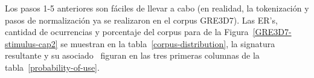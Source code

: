 

Los pasos 1-5 anteriores son f\'aciles de llevar a cabo (en realidad, la tokenizaci\'on y
pasos de normalizaci\'on ya se realizaron en el corpus GRE3D7). 
Las ER's, cantidad de ocurrencias y porcentaje del corpus para de la Figura~\ref{GRE3D7-stimulus-cap2} se muestran en la tabla~\ref{corpus-distribution}, la signatura resultante y su asociado \puse\ figuran en las tres primeras columnas de la tabla~\ref{probability-of-use}.


